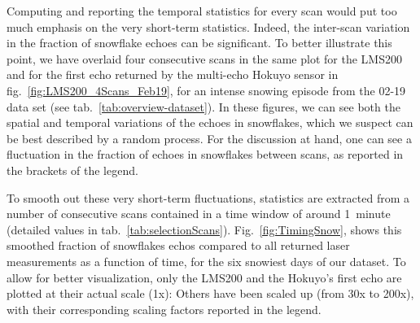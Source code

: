 Computing and reporting the temporal statistics for every scan would put too much emphasis on the very short-term statistics. Indeed, the inter-scan variation in the fraction of snowflake echoes can be significant. To better illustrate this point, we have overlaid four consecutive scans in the same plot for the LMS200 and for the first echo returned by the multi-echo Hokuyo sensor in fig.~\ref{fig:LMS200_4Scans_Feb19}, for an intense snowing episode from the 02-19 data set (see tab.~\ref{tab:overview-dataset}). In these figures, we can see both the spatial and temporal variations of the echoes in snowflakes, which we suspect can be best described by a random process. For the discussion at hand, one can see a fluctuation in the fraction of echoes in snowflakes between scans, as reported in the brackets of the legend. 

To smooth out these very short-term fluctuations, statistics are extracted from a number of consecutive scans contained in a time window of around 1~minute (detailed values in tab.~\ref{tab:selectionScans}). Fig.~\ref{fig:TimingSnow}, shows this smoothed fraction of snowflakes echos compared to all returned laser measurements as a function of time, for the six snowiest days of our dataset. To allow for better visualization, only the LMS200 and the Hokuyo's first echo are plotted at their actual scale (1x): Others have been scaled up (from 30x to 200x), with their corresponding scaling factors reported in the legend. 


